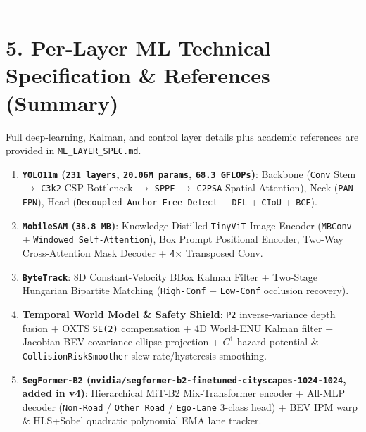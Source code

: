 \documentclass[10.5pt,a4paper]{article}
\begin{document}
\par\noindent\rule{\textwidth}{0.4pt}\par\medskip

\section{5. Per-Layer ML Technical Specification \& References (Summary)}

Full deep-learning, Kalman, and control layer details plus academic references are provided in \href{https://github.com/Heisnotanimposter/Totalcare\_autonomous\_driving\_Yolov5/blob/main/ML\_LAYER\_SPEC.md}{\texttt{ML\_\allowbreak{}LAYER\_\allowbreak{}SPEC.\allowbreak{}md}}.


\begin{enumerate}[leftmargin=1.8em,itemsep=2pt]
\item \textbf{\texttt{YOLO11m} (\texttt{231 layers}, \texttt{20.\allowbreak{}06M params}, \texttt{68.\allowbreak{}3 GFLOPs})}: Backbone (\texttt{Conv} Stem $\rightarrow$ \texttt{C3k2} CSP Bottleneck $\rightarrow$ \texttt{SPPF} $\rightarrow$ \texttt{C2PSA} Spatial Attention), Neck (\texttt{PAN-\allowbreak{}FPN}), Head (\texttt{Decoupled Anchor-\allowbreak{}Free Detect} + \texttt{DFL} + \texttt{CIoU} + \texttt{BCE}).
\item \textbf{\texttt{MobileSAM} (\texttt{38.\allowbreak{}8 MB})}: Knowledge-Distilled \texttt{TinyViT} Image Encoder (\texttt{MBConv} + \texttt{Windowed Self-\allowbreak{}Attention}), Box Prompt Positional Encoder, Two-Way Cross-Attention Mask Decoder + \texttt{4$\times$} Transposed Conv.
\item \textbf{\texttt{ByteTrack}}: 8D Constant-Velocity BBox Kalman Filter + Two-Stage Hungarian Bipartite Matching (\texttt{High-\allowbreak{}Conf} + \texttt{Low-\allowbreak{}Conf} occlusion recovery).
\item \textbf{Temporal World Model \& Safety Shield}: \texttt{P2} inverse-variance depth fusion + OXTS \texttt{SE(2)} compensation + 4D World-ENU Kalman filter + Jacobian BEV covariance ellipse projection + $C^1$ hazard potential \& \texttt{CollisionRiskSmoother} slew-rate/hysteresis smoothing.
\item \textbf{\texttt{SegFormer-\allowbreak{}B2} (\texttt{nvidia/\allowbreak{}segformer-\allowbreak{}b2-\allowbreak{}finetuned-\allowbreak{}cityscapes-\allowbreak{}1024-\allowbreak{}1024}, added in v4)}: Hierarchical MiT-B2 Mix-Transformer encoder + All-MLP decoder (\texttt{Non-\allowbreak{}Road} / \texttt{Other Road} / \texttt{Ego-\allowbreak{}Lane} 3-class head) + BEV IPM warp \& HLS+Sobel quadratic polynomial EMA lane tracker.
\end{enumerate}
\end{document}
